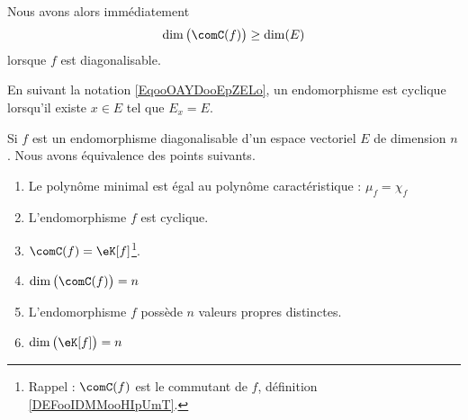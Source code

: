 \begin{remark}      \label{REMooUGFQooVzCOvV}
	Nous avons alors immédiatement
	\begin{equation}
		\dim\big( \comC(f) \big)\geq\dim(E)
	\end{equation}
	lorsque \( f\) est diagonalisable.
\end{remark}

En suivant la notation \eqref{EqooOAYDooEpZELo}, un endomorphisme est cyclique lorsqu'il existe \( x\in E\) tel que \( E_x=E\).

\begin{proposition}      \label{PropooQALUooTluDif}
	Si \( f\) est un endomorphisme diagonalisable d'un espace vectoriel \( E\) de dimension \( n\). Nous avons équivalence des points suivants.
	\begin{enumerate}
		\item\label{ITEMooSOYYooZVibjrii}
		      Le polynôme minimal est égal au polynôme caractéristique : \( \mu_f=\chi_f\)
		\item\label{ITEMooSOYYooZVibjrvi}
		      L'endomorphisme \( f\) est cyclique.
		\item\label{ITEMooSOYYooZVibjrv}
		      \( \comC(f)=\eK[f]\)\footnote{Rappel : \( \comC(f)\) est le commutant de \( f\), définition \ref{DEFooIDMMooHIpUmT}.}.
		\item\label{ITEMooSOYYooZVibjriv}
		      \( \dim\big( \comC(f) \big)=n\)
		\item\label{ITEMooSOYYooZVibjriii}
		      L'endomorphisme \( f\) possède \( n\) valeurs propres distinctes.
		\item   \label{ITEMooSOYYooZVibjri}
		      \( \dim\big( \eK[f] \big)=n\)
	\end{enumerate}
\end{proposition}

